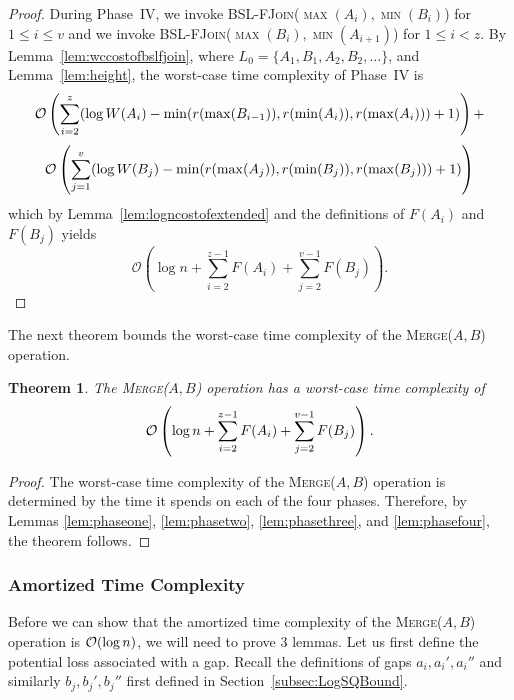\documentclass[11pt]{article}
\newcommand{\kwUnion}{Merge}
\newcommand{\Unionx}[2]{\mbox{\textsc{\kwUnion(\ensuremath{#1,#2})}}}
\newcommand{\Bslfjoinx}[2]{\mbox{\textsc{BSL-FJoin(\ensuremath{#1,#2})}}}
\newcommand{\lasta}{z}
\newcommand{\lastb}{v}
\newcommand{\intmax}[1]{\ensuremath{\max(\intl #1)}}
\newcommand{\intmin}[1]{\ensuremath{\min(\intl #1)}}
\newcommand{\intl}[1]{\ensuremath{#1}}
\newcommand{\intweight}[1]{{\ensuremath{W(\intl #1)}}}
\newcommand{\noderank}[1]{\ensuremath{r(\node #1)}}
\newcommand{\node}[1]{\ensuremath{#1}}
\newcommand{\agap}[1]{\ensuremath{a_{#1}}}
\newcommand{\leftofa}[1]{\ensuremath{a_{#1}'}}
\newcommand{\rightofa}[1]{\ensuremath{a_{#1}''}}
\newcommand{\bgap}[1]{\ensuremath{b_{#1}}}
\newcommand{\leftofb}[1]{\ensuremath{b_{#1}'}}
\newcommand{\rightofb}[1]{\ensuremath{b_{#1}''}}
\newcommand{\intfun}[1]{\ensuremath{F(\intl #1)}}
\newcounter{count}
\newtheorem{thm}[count]{Theorem}
\begin{document}
\begin{proof} 

During Phase~IV, we invoke \Bslfjoinx{\intmax{A_{i}}}{\intmin{B_i}} for $1\leq i \leq \lastb$ and we invoke \Bslfjoinx{\intmax{B_{i}}}{\intmin{A_{i+1}}} for $1\leq i<z$. 
By Lemma~\ref{lem:wccostofbslfjoin}, where $L_{0}=\{A_{1},B_{1},A_{2},B_{2},\ldots\}$, and Lemma~\ref{lem:height}, the worst-case time complexity of Phase~IV is 
\[ 
\mathcal O\left(\sum_{i=2}^{\lasta} (\log\intweight{A_i} - \min(\noderank{\intmax{B_{i-1}}},\noderank{\intmin{A_i}},\noderank{\intmax{A_{i}}})+1)\right)+ 
\] 
\[\mathcal O\left(\sum_{j=1}^{\lastb} (\log\intweight{B_j} - \min(\noderank{\intmax{A_j}},\noderank{\intmin{B_j}},\noderank{\intmax{B_{j}}})+1)\right)
\] 
which by Lemma~\ref{lem:logncostofextended} and the definitions of \intfun{A_i} and \intfun{B_j} yields 
\[\mathcal O\left(\log n + \sum_{i=2}^{\lasta-1} \intfun{A_i} +\sum_{j=2}^{\lastb-1} \intfun{B_j}\right).\] 
\end{proof} 

The next theorem bounds the worst-case time complexity of the \Unionx{A}{B} operation. 




\begin{thm} 
\label{thm:unionworstcase} 
The \Unionx{A}{B} operation has a worst-case time complexity of 
\[{\cal O}\left(\log n + \sum_{i=2}^{\lasta-1}\intfun{A_i} + \sum_{j=2}^{\lastb-1}\intfun{B_j} \right).\] 
\end{thm} 
\begin{proof} 
The worst-case time complexity of the \Unionx{A}{B} operation is determined by the time it spends on each of the four phases. 
Therefore, by Lemmas \ref{lem:phaseone}, \ref{lem:phasetwo}, \ref{lem:phasethree}, and \ref{lem:phasefour}, the theorem follows. 


\end{proof} 



\subsubsection{Amortized Time Complexity} 
\label{subsubsec:AnalysisUnionAmortized} 

Before we can show that the amortized time complexity of the \Unionx{A}{B} operation is ${\cal O}(\log n)$, we will need to prove 3 lemmas. Let us first define the potential loss associated with a gap. Recall the definitions of gaps $\agap{i}, \leftofa i, \rightofa i$ and similarly $ \bgap{j}, \leftofb j, \rightofb j$ first defined in Section~\ref{subsec:LogSQBound}. 
\end{document}
